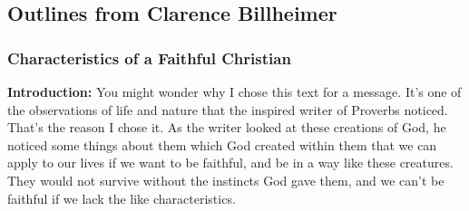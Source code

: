 \subsection{Outlines from Clarence Billheimer}


\subsubsection{Characteristics of a Faithful Christian}


\noindent  \textbf{Introduction: } You might wonder why I chose this text for a message. It’s one of the observations of life and nature that the inspired writer of Proverbs noticed. That’s the reason I chose it. As the writer looked at these creations of God, he noticed some things about them which God created within them that we can apply to our lives if we want to be faithful, and be in a way like these creatures. They would not survive without the instincts God gave them, and we can’t be faithful if we lack the like characteristics.\\
\\
